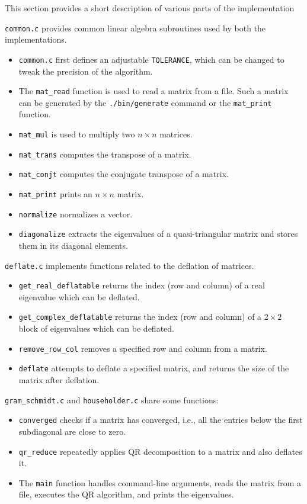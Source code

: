\documentclass{article}
\begin{document}
This section provides a short description of various parts of the implementation

\texttt{common.c} provides common linear algebra subroutines used by both
the implementations.

\begin{itemize}
    \item \texttt{common.c} first defines an adjustable \texttt{TOLERANCE}, which can
    be changed to tweak the precision of the algorithm.
    \item The \texttt{mat\_read} function is used to read a matrix from a file. Such a
    matrix can be generated by the \texttt{./bin/generate} command or the \texttt{mat\_print}
    function.
    \item \texttt{mat\_mul} is used to multiply two $n \times n$ matrices.
    \item \texttt{mat\_trans} computes the transpose of a matrix.
    \item \texttt{mat\_conjt} computes the conjugate transpose of a matrix.
    \item \texttt{mat\_print} prints an $n \times n$ matrix.
    \item \texttt{normalize} normalizes a vector.
    \item \texttt{diagonalize} extracts the eigenvalues of a quasi-triangular matrix
    and stores them in its diagonal elements.
\end{itemize}

\texttt{deflate.c} implements functions related to the deflation of matrices.

\begin{itemize}
    \item \texttt{get\_real\_deflatable} returns the index (row and column) of a real
    eigenvalue which can be deflated.
    \item \texttt{get\_complex\_deflatable} returns the index (row and column) of a
    $2 \times 2$ block of eigenvalues which can be deflated.
    \item \texttt{remove\_row\_col} removes a specified row and column from a matrix.
    \item \texttt{deflate} attempts to deflate a specified matrix, and returns the size
    of the matrix after deflation.
\end{itemize}

\texttt{gram\_schmidt.c} and \texttt{householder.c} share some functions:

\begin{itemize}
    \item \texttt{converged} checks if a matrix has converged, i.e., all the
    entries below the first subdiagonal are close to zero.
    \item \texttt{qr\_reduce} repeatedly applies QR decomposition to a matrix and
    also deflates it.
    \item The \texttt{main} function handles command-line arguments, reads the
    matrix from a file, executes the QR algorithm, and prints the eigenvalues.
\end{itemize}
\end{document}
